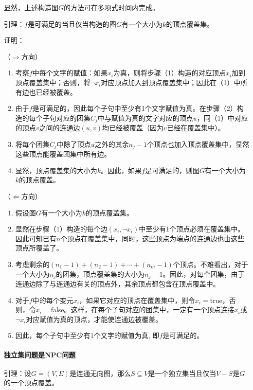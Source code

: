 \documentclass[./../main.tex]{subfiles}
\begin{document}
显然，上述构造图$G$的方法可在多项式时间内完成。

引理：$f$是可满足的当且仅当构造的图$G$有一个大小为$k$的顶点覆盖集。

证明：

（$\Rightarrow$方向）
\begin{enumerate}
    \item 考察$f$中每个文字的赋值：如果$x_{i}$为真，则将步骤（1）构造的对应顶点$x_{i}$加到顶点覆盖集中；否则，将$\neg x_{i}$对应顶点加入到顶点覆盖集中；因此在（1）中所有边也已经被覆盖。
    \item 由于$f$是可满足的，因此每个子句中至少有1个文字赋值为真。在步骤（2）构造的每个子句对应的团集$C_{j}$中与赋值为真的文字对应的顶点$u$，同（1）中对应的顶点$v$之间的连通边$(u,v)$均已经被覆盖（因为$v$已经在覆盖集中）。
    \item 将每个团集$C_{j}$中除了顶点$u$之外的其余$n_{j}-1$个顶点也加入顶点覆盖集中，显然这些顶点能覆盖团集中所有边。
    \item 显然，顶点覆盖集的大小为$k$。因此，如果$f$是可满足的，则图$G$有一个大小为$k$的顶点覆盖。
\end{enumerate}

（$\Leftarrow$方向）
\begin{enumerate}
    \item 假设图$G$有一个大小为$k$的顶点覆盖集。
    \item 显然在步骤（1）构造的每个边$(x_{i},\neg x_{i})$中至少有1个顶点必须在覆盖集中。因此可知已有$n$个顶点在覆盖集中，同时，这些顶点为端点的连通边也由这些顶点所覆盖了。
    \item 考虑剩余的$(n_{1}-1)+(n_{2}-1)+\cdots+(n_{m}-1)$个顶点。不难看出，对于一个大小为$n_{j}$的团集，顶点覆盖集的大小为$n_{j}-1$。因此，对每个团集，由于连通边除了与连通边有关的顶点外，其余顶点都包含在顶点覆盖中。
    \item 对于$f$中的每个变元$x_{i}$，如果它对应的顶点在覆盖集中，则令$x_{i}=$true，否则，令$x_{i}=$false。这样，在每个子句对应的团集中，一定有一个顶点连接$x_{i}$或$\neg x_{i}$对应赋值为真的顶点，才能使连通边被覆盖。
    \item 因此，每个子句中至少有1个文字的赋值为真, 即$f$是可满足的。
\end{enumerate}

\paragraph{独立集问题是NPC问题}
引理：设$G=(V,E)$是连通无向图，那么$S \subseteq V$是一个独立集当且仅当$V-S$是$G$的一个顶点覆盖。
\end{document}
